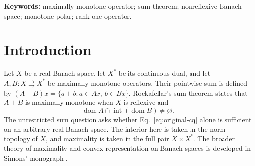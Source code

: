 \documentclass[11pt]{article}
\newcommand{\dom}{\operatorname{dom}}
\begin{document}
\begin{abstract}
extensions and convex combinations of graph points.
\else
We construct a maximally monotone operator on $c_0$ whose sum with a
bounded positive rank-one operator is not maximally monotone, although
the second operator has full domain and Rockafellar's interior-domain
condition holds. The construction couples countably many triangular
operators through a Lipschitz curve of block sums. Each actual parameter
has a finitely supported tail; the common limiting tail belongs to
$\ell^2\setminus\ell^1$. We compute the entire monotone polar and prove
maximality by showing that a point over the missing parameter interval
would require a nonsummable continuous-dual label. An exact pairing
identity then supplies a proper monotone extension of the sum. We also
prove an abstract criterion that identifies the precise failure of
endpoint realization used in the construction, and derive the finite
radial bound and the nonconvexity of the first operator's domain closure.
\fi
\end{abstract}

\noindent\textbf{Keywords:} maximally monotone operator; sum theorem;
nonreflexive Banach space; monotone polar; rank-one operator.

\section{Introduction}
\label{sec:introduction}
Let $X$ be a real Banach space, let $X^*$ be its continuous dual, and let
$A,B:X\rightrightarrows X^*$ be maximally monotone operators. Their pointwise
sum is defined by $(A+B)x=\{a+b:a\in Ax,\ b\in Bx\}$. Rockafellar's sum
theorem \cite{rockafellar1970} states that $A+B$ is maximally monotone when
$X$ is reflexive and
\begin{equation}
\dom A\cap\operatorname{int}(\dom B)\ne\varnothing.
\label{eq:original-cq}
\end{equation}
The unrestricted sum question asks whether Eq.~\eqref{eq:original-cq}
alone is sufficient on an arbitrary real Banach space. The interior here
is taken in the norm topology of $X$, and maximality is taken in the full
pair $X\times X^*$.
The broader theory of maximality and convex representation on Banach
spaces is developed in Simons' monograph \cite{simons2008}.
\end{document}
